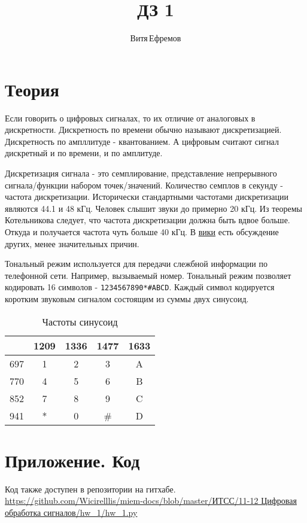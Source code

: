 \documentclass[a4paper,12pt]{article}
\begin{document}
\sloppy

\title{ДЗ 1}
\author{Витя\,Ефремов}
\maketitle

\tableofcontents

\section{Теория}
Если говорить о цифровых сигналах, то их отличие от аналоговых в дискретности.
Дискретность по времени обычно называют дискретизацией.
Дискретность по ампллитуде - квантованием.
А цифровым считают сигнал дискретный и по времени, и по амплитуде.

Дискретизация сигнала - это семплирование, представление непрерывного сигнала/функции набором точек/значений.
Количество семплов в секунду - частота дискретизации.
Исторически стандартными частотами дискретизации являются 44.1 и 48 кГц.
Человек слышит звуки до примерно 20 кГц.
Из теоремы Котельникова следует, что частота дискретизации должна быть вдвое больше.
Откуда и получается частота чуть больше 40 кГц.
В \href{https://en.wikipedia.org/wiki/44,100_Hz}{вики} есть обсуждение других, менее значительных причин.

Тональный режим используется для передачи слежбной информации по телефонной сети.
Например, вызываемый номер.
Тональный режим позволяет кодировать 16 символов - \texttt{1234567890*\#ABCD}.
Каждый символ кодируется коротким звуковым сигналом состоящим из суммы двух синусоид.

\begin{table*}[ht]
    \centering
    \begin{tabular}{|c|c|c|c|c|}
        \hline & 1209 & 1336 & 1477 & 1633 \\
        \hline 697 & 1 & 2 & 3 & A \\
        \hline 770 & 4 & 5 & 6 & B \\
        \hline 852 & 7 & 8 & 9 & C \\
        \hline 941 & * & 0 & \# & D \\
        \hline
    \end{tabular}
    \caption{Частоты синусоид}
\end{table*}

\section{Приложение. Код}
Код также доступен в репозитории на гитхабе.
\url{https://github.com/Wicirelllis/miem-docs/blob/master/ИТСС/11-12 Цифровая обработка сигналов/hw_1/hw_1.py}

\inputminted[fontsize=\scriptsize]{python}{hw_1.py}
\end{document}
